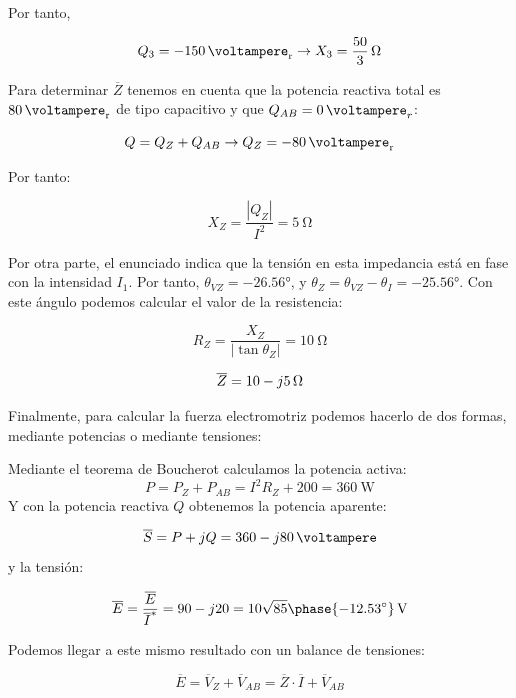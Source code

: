 \documentclass[12pt]{article}
\begin{document}
Por tanto,

\[
   Q_3 = -\SI{150}{\voltampere_r} \rightarrow X_3 = \SI[parse-numbers=false]{\frac{50}{3}}{\ohm}
\]

Para determinar $\overline{Z}$ tenemos en cuenta que la potencia reactiva total es $\SI{80}{\voltampere_r}$ de tipo capacitivo y que $Q_{AB} = \SI{0}{\voltampere}_r$:

\[
  Q = Q_Z + Q_{AB} \rightarrow Q_Z = -\SI{80}{\voltampere_r} 
\]

Por tanto:

\[
  X_Z = \frac{|Q_Z|}{I^2} = \SI{5}{\ohm}
\]

Por otra parte, el enunciado indica que la tensión en esta impedancia está en fase con la intensidad $I_1$. Por tanto, $\theta_{VZ} = \ang{-26.56}$, y $\theta_Z = \theta_{VZ} - \theta_{I} = \ang{-25.56}$. Con este ángulo podemos calcular el valor de la resistencia:

\[
  R_Z = \frac{X_Z}{|\tan\theta_Z|} = \SI{10}{\ohm}
\]

\[
  \overline{Z} =  \SI[parse-numbers=false]{10 - j5}{\ohm}
\]

Finalmente, para calcular la fuerza electromotriz podemos hacerlo de dos formas, mediante potencias o mediante tensiones:

Mediante el teorema de Boucherot calculamos la potencia activa:
\[
P = P_Z + P_{AB} = I^2 R_Z + 200 = \SI{360}{\watt}
\]
Y con la potencia reactiva $Q$ obtenemos la potencia aparente:

\[
  \overline{S} = P + jQ = \SI[parse-numbers=false]{360 -j80}{\voltampere}
\]
y la tensión:

\[
  \overline{E} = \frac{\overline{E}}{\overline{I}^*} = 90 - j20 = \SI[parse-numbers=false]{10\sqrt{85}\phase{\ang{-12.53}}}{\volt}
\]

Podemos llegar a este mismo resultado con un balance de tensiones:

\[
  \overline{E} = \overline{V}_Z + \overline{V}_{AB} = \overline{Z} \cdot \overline{I} + \overline{V}_{AB}
\]
\end{document}
